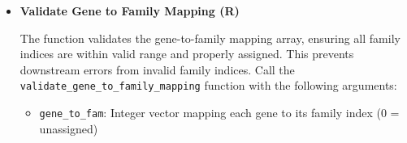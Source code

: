\documentclass[11pt]{article}
\begin{document}
\begin{enumerate}
\begin{itemize}
\begin{itemize}
	      	      	\item \texttt{expression\_vectors}: Numeric matrix of expression values (n\_samples
	      	      	      × n\_genes)
	      	      	      
	      	      	\item \texttt{gene\_to\_fam}: Integer vector mapping each gene to its family
	      	      	      index (0 = unassigned)
	      	      \end{itemize}
	      	      
	      	      \textbf{Return list:}
	      	      \begin{itemize}
	      	      	\item \textbf{gene\_ids}: Filtered character vector of gene IDs
	      	      	      
	      	      	\item \textbf{expression\_vectors}: Filtered numeric matrix of expression
	      	      	      values
	      	      	      
	      	      	\item \textbf{gene\_to\_fam}: Filtered integer vector mapping each gene to
	      	      	      its family index
	      	      	      
	      	      	\item \textbf{n\_genes\_kept}: Number of genes kept after filtering
	      	      \end{itemize}
	      	      
	      	      \begin{lstlisting}[language=R, caption={R Filter Unassigned Genes}]
filter_unassigned_genes(gene_ids, expression_vectors, gene_to_fam)
	      	      \end{lstlisting}
	      	      
	      	\item \textbf{Validate Gene to Family Mapping (R)}
	      	      
	      	      The function validates the gene-to-family mapping array, ensuring all
	      	      family indices are within valid range and properly assigned. This prevents
	      	      downstream errors from invalid family indices. Call the \texttt{validate\_gene\_to\_family\_mapping}
	      	      function with the following arguments:
	      	      
	      	      \begin{itemize}
	      	      	\item \texttt{gene\_to\_fam}: Integer vector mapping each gene to its family
	      	      	      index (0 = unassigned)
	      	      	      

\end{itemize}
\end{itemize}
\end{enumerate}
\end{document}
